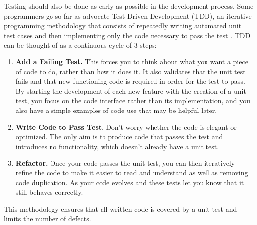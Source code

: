 \documentclass[ChapterTOCs,krantz2]{krantz} %
\begin{document}
Testing should also be done as early as possible in the development process.
Some programmers go so far as advocate Test-Driven Development (TDD), an
iterative programming methodology that consists of repeatedly writing automated
unit test cases and then implementing only the code necessary to pass the test
\cite{Bec02, Ast03}.  TDD can be thought of as a continuous cycle of 3 steps:

\begin{enumerate}

\item {\bf Add a Failing Test.} This forces you to think about what you want a
piece of code to do, rather than how it does it.  It also validates that the
unit test fails and that new functioning code is required in order for the test
to pass. By starting the development of each new feature with the creation of a
unit test, you focus on the code interface rather than its implementation, and
you also have a simple examples of code use that may be helpful later.

\item {\bf Write Code to Pass Test.} Don't worry whether the code is elegant or
optimized. The only aim is to produce code that passes the test and introduces
no functionality, which doesn't already have a unit test.

\item {\bf Refactor.} Once your code passes the unit test, you can then iteratively
refine the code to make it easier to read and understand as well as removing code
duplication. As your code evolves and these tests let you know that it still
behaves correctly.

\end{enumerate}

This methodology ensures that all written code is covered by a unit test and
limits the number of defects.
\end{document}
